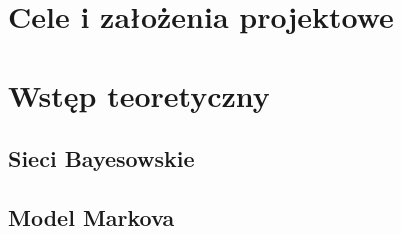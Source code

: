 \section{Cele i założenia projektowe}

\section{Wstęp teoretyczny}

\newpage

\subsection{Sieci Bayesowskie}

\newpage

\subsection{Model Markova}
